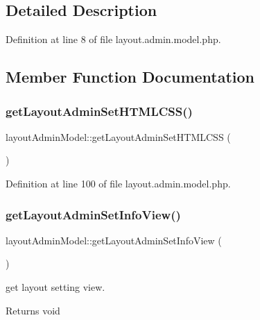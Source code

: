 \subsection{Detailed Description}


Definition at line 8 of file layout.\+admin.\+model.\+php.



\subsection{Member Function Documentation}
\hypertarget{classlayoutAdminModel_a5757eaff4093fe8a359b4f3b5a6a2bff}{}\label{classlayoutAdminModel_a5757eaff4093fe8a359b4f3b5a6a2bff} 
\subsubsection{\texorpdfstring{get\+Layout\+Admin\+Set\+H\+T\+M\+L\+C\+S\+S()}{getLayoutAdminSetHTMLCSS()}}
{\footnotesize\ttfamily layout\+Admin\+Model\+::get\+Layout\+Admin\+Set\+H\+T\+M\+L\+C\+SS (\begin{DoxyParamCaption}{ }\end{DoxyParamCaption})}



Definition at line 100 of file layout.\+admin.\+model.\+php.

\hypertarget{classlayoutAdminModel_a7171578a8c44846e96b6330378152ddd}{}\label{classlayoutAdminModel_a7171578a8c44846e96b6330378152ddd} 
\subsubsection{\texorpdfstring{get\+Layout\+Admin\+Set\+Info\+View()}{getLayoutAdminSetInfoView()}}
{\footnotesize\ttfamily layout\+Admin\+Model\+::get\+Layout\+Admin\+Set\+Info\+View (\begin{DoxyParamCaption}{ }\end{DoxyParamCaption})}

get layout setting view. \begin{DoxyReturn}{Returns}
void 
\end{DoxyReturn}


